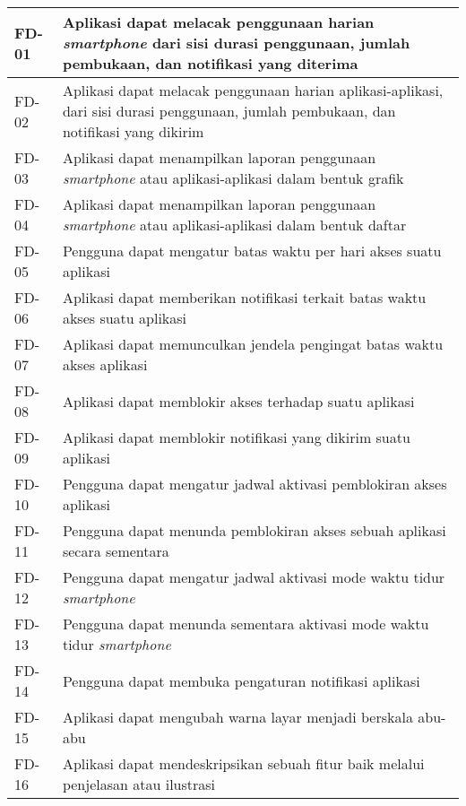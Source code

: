 \begin{footnotesize}
\begin{longtable}[c]{|W{c}{0.07\textwidth}|>{\ccnormspacing}m{0.86\textwidth}|}
  FD-01  &  Aplikasi dapat melacak penggunaan harian \textit{smartphone} dari sisi durasi penggunaan, jumlah pembukaan, dan notifikasi yang diterima \\ \hline
  FD-02  &  Aplikasi dapat melacak penggunaan harian aplikasi-aplikasi, dari sisi durasi penggunaan, jumlah pembukaan, dan notifikasi yang dikirim \\ \hline
  FD-03  &  Aplikasi dapat menampilkan laporan penggunaan \textit{smartphone} atau aplikasi-aplikasi dalam bentuk grafik \\ \hline
  FD-04  &  Aplikasi dapat menampilkan laporan penggunaan \textit{smartphone} atau aplikasi-aplikasi dalam bentuk daftar \\ \hline
  FD-05  &  Pengguna dapat mengatur batas waktu per hari akses suatu aplikasi \\ \hline
  FD-06  &  Aplikasi dapat memberikan notifikasi terkait batas waktu akses suatu aplikasi \\ \hline
  FD-07  &  Aplikasi dapat memunculkan jendela pengingat batas waktu akses aplikasi \\ \hline
  FD-08  &  Aplikasi dapat memblokir akses terhadap suatu aplikasi \\ \hline
  FD-09  &  Aplikasi dapat memblokir notifikasi yang dikirim suatu aplikasi \\ \hline
  FD-10  &  Pengguna dapat mengatur jadwal aktivasi pemblokiran akses aplikasi \\ \hline
  FD-11  &  Pengguna dapat menunda pemblokiran akses sebuah aplikasi secara sementara \\ \hline
  FD-12  &  Pengguna dapat mengatur jadwal aktivasi mode waktu tidur \textit{smartphone} \\ \hline
  FD-13  &  Pengguna dapat menunda sementara aktivasi mode waktu tidur \textit{smartphone} \\ \hline
  FD-14  &  Pengguna dapat membuka pengaturan notifikasi aplikasi \\ \hline
  FD-15  &  Aplikasi dapat mengubah warna layar menjadi berskala abu-abu \\ \hline
  FD-16  &  Aplikasi dapat mendeskripsikan sebuah fitur baik melalui penjelasan atau ilustrasi \\ \hline
\end{longtable}
\end{footnotesize}
\justifying
\FloatBarrier

